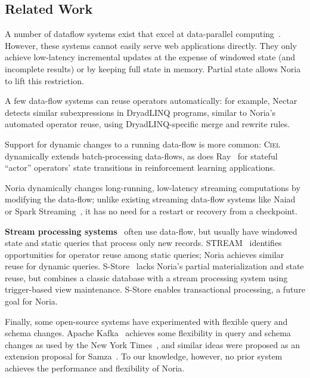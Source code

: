 \subsection{Related Work}

\resume

A number of dataflow systems exist that excel at data-parallel
computing~\cite{dryad, naiad}. However, these systems cannot easily serve web
applications directly. They only achieve low-latency incremental updates at the
expense of windowed state (and incomplete results) or by keeping full state in
memory. Partial state allows Noria to lift this restriction.

A few data-flow systems can reuse operators automatically: for example,
Nectar~\cite{nectar} detects similar subexpressions in DryadLINQ programs,
similar to Noria's automated operator reuse, using DryadLINQ-specific
merge and rewrite rules.

Support for dynamic changes to a running data-flow is more common:
\textsc{Ciel}~\cite{ciel} dynamically extends batch-processing data-flows,
as does Ray~\cite{ray} for stateful ``actor'' operators' state transitions
in reinforcement learning applications.

Noria dynamically changes long-running, low-latency streaming computations by
modifying the data-flow; unlike existing streaming data-flow systems like
Naiad~\cite{naiad} or Spark Streaming~\cite{spark-streaming}, it has no
need for a restart or recovery from a checkpoint.

\textbf{Stream processing systems}~\cite{storm, heron, flink, millwheel,
spark-streaming} often use data-flow, but usually have windowed state and
static queries that process only new records. STREAM~\cite{stanford-stream}
identifies opportunities for operator reuse among static queries; Noria achieves
similar reuse for dynamic queries. S-Store~\cite{s-store} lacks Noria's partial
materialization and state reuse, but combines a classic database with a stream
processing system using trigger-based view maintenance. S-Store enables
transactional processing, a future goal for Noria.

Finally, some open-source systems have experimented with flexible query and
schema changes.
%
Apache Kafka~\cite{kafka} achieves some flexibility in query and schema
changes as used by the New York Times~\cite{nyt-kafka}, and
%
similar ideas were proposed as an extension proposal for
Samza~\cite{samza-blogpost}.
%
To our knowledge, however, no prior system achieves the performance and
flexibility of Noria.
%

